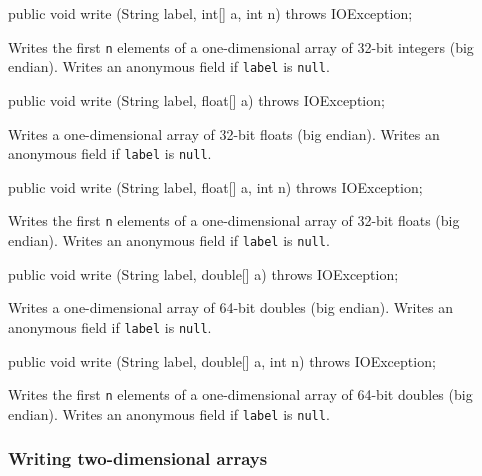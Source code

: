 \begin{code}

   public void write (String label, int[] a, int n) throws IOException;
\end{code}
\begin{tabb}
Writes the first \texttt{n} elements of a one-dimensional array of 32-bit integers (big endian).
Writes an anonymous field if \texttt{label} is \texttt{null}.
\end{tabb}

\begin{code}

   public void write (String label, float[] a) throws IOException;
\end{code}
\begin{tabb}
Writes a one-dimensional array of 32-bit floats (big endian).
Writes an anonymous field if \texttt{label} is \texttt{null}.
\end{tabb}

\begin{code}

   public void write (String label, float[] a, int n) throws IOException;
\end{code}
\begin{tabb}
Writes the first \texttt{n} elements of a one-dimensional array of 32-bit floats (big endian).
Writes an anonymous field if \texttt{label} is \texttt{null}.
\end{tabb}

\begin{code}

   public void write (String label, double[] a) throws IOException;
\end{code}
\begin{tabb}
Writes a one-dimensional array of 64-bit doubles (big endian).
Writes an anonymous field if \texttt{label} is \texttt{null}.
\end{tabb}

\begin{code}

   public void write (String label, double[] a, int n) throws IOException;
\end{code}
\begin{tabb}
Writes the first \texttt{n} elements of a one-dimensional array of 64-bit doubles (big endian).
Writes an anonymous field if \texttt{label} is \texttt{null}.
\end{tabb}


\subsubsection*{Writing two-dimensional arrays}

